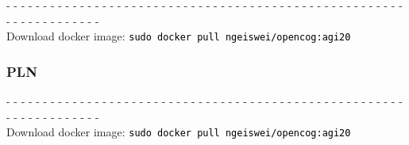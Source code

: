 \documentclass[aspectratio=169]{beamer}
\begin{document}
\begin{frame}
\begin{columns}
  \end{columns}

  - - - - - - - - - - - - - - - - - - - - - - - - - - - - - - - - - -
  - - - - - - - - - - - - - - - - - - - - - - - - - - - - - - - - -\\[0.1cm]
  Download docker image: \texttt{\textcolor{black}{sudo docker pull ngeiswei/opencog:agi20}}

\end{frame}

\begin{frame}
  
  \frametitle{PLN}
    - - - - - - - - - - - - - - - - - - - - - - - - - - - - - - - - - -
  - - - - - - - - - - - - - - - - - - - - - - - - - - - - - - - - -\\[0.1cm]
  Download docker image: \texttt{\textcolor{black}{sudo docker pull ngeiswei/opencog:agi20}}

\end{frame}
\end{document}

